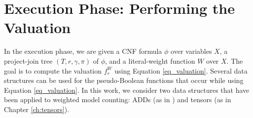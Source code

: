 \section{Execution Phase: Performing the Valuation}
\label{sec_execution}

In the execution phase, we are given a CNF formula $\phi$ over variables $X$, a project-join tree $(T, r, \gamma, \pi)$ of $\phi$, and a literal-weight function $W$ over $X$.
The goal is to compute the valuation $f^W_r$ using Equation \eqref{eq_valuation}.
Several data structures can be used for the pseudo-Boolean functions that occur while using Equation \eqref{eq_valuation}.
In this work, we consider two data structures that have been applied to weighted model counting: ADDs (as in \cite{DPV20}) and tensors (as in Chapter \ref{ch:tensors}).







